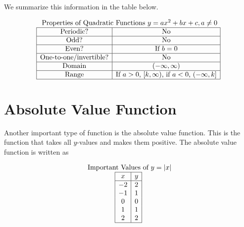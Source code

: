 \documentclass[nooutcomes]{ximera}
\begin{document}
We summarize this information in the table below.
 
\[
\begin{array}{  c  }
\text{ Properties of Quadratic Functions } y=ax^2 + bx + c, a \ne 0 \\
 \begin{array}{|c|c|}
 \hline
\text{Periodic?} & \text{No} \\ \hline
\text{Odd?} & \text{No} \\ \hline
\text{Even?} & \text{If } b = 0 \\ \hline
\text{One-to-one/invertible?} & \text{No}\\ \hline
\text{Domain} & (-\infty,\infty)\\ \hline
\text{Range} & \text{If }a > 0\text{, } [k,\infty) \text{, if }a < 0\text{, } (-\infty, k]\\ \hline
\end{array}
\end{array}
\]
 
 
 
\newpage
 
 
\section{Absolute Value Function}
Another important type of function is the absolute value function.  This is the function that takes all $y$-values and makes them positive.  The absolute value function is written as
 
\begin{center}
\end{center}
 
\begin{center}
\end{center}
 
\[
\begin{array}{c }
\text{ Important Values of $y=|x|$} \\
\begin{array}{|c|c|}
 \hline
 x & y\\
 \hline
 -2&2\\
-1&1\\
0&0\\
 1&1\\
 2&2\\
 \hline
\end{array}
\end{array}
\]
 
\end{document}
